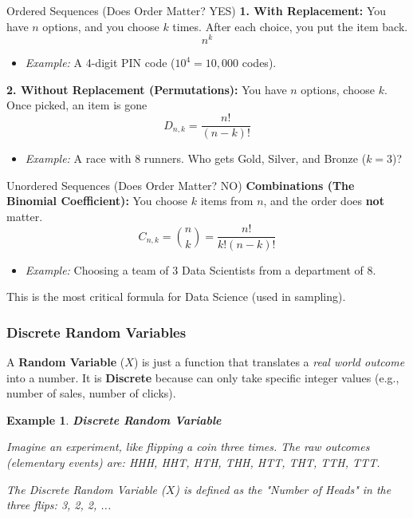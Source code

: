 \documentclass[11pt]{article}
\theoremstyle{smallexample}
\newtheorem{example}{Example}[section]
\newcommand{\vs}{\vspace{0.2\baselineskip}}
\begin{document}
\begin{defbox}{Ordered Sequences (Does Order Matter? YES)}
\textbf{1. With Replacement:}
You have $n$ options, and you choose $k$ times. After each choice, you put the item back.
\begin{equation}
n^k
\end{equation}
\begin{itemize}
    \item \textit{Example:} A 4-digit PIN code ($10^4 = 10,000$ codes).
\end{itemize}

\vs
\textbf{2. Without Replacement (Permutations):}
You have $n$ options, choose $k$. Once picked, an item is gone
\begin{equation}
D_{n,k} = \frac{n!}{(n-k)!}
\end{equation}
\begin{itemize}
    \item \textit{Example:} A race with 8 runners. Who gets Gold, Silver, and Bronze ($k=3$)?

\end{itemize}
\end{defbox}

\begin{defbox}{Unordered Sequences (Does Order Matter? NO)}
\textbf{Combinations (The Binomial Coefficient):}
You choose $k$ items from $n$, and the order does \textbf{not} matter.
    \begin{equation}
        C_{n,k} = \binom{n}{k} = \frac{n!}{k!(n-k)!}
    \end{equation}
\begin{itemize}
    \item \textit{Example:} Choosing a team of 3 Data Scientists from a department of 8.
\end{itemize}
\end{defbox}

This is the most critical formula for Data Science (used in sampling).

\subsubsection{Discrete Random Variables}

A \textbf{Random Variable} ($X$) is just a function that translates a \textit{real world outcome} into a number. It is \textbf{Discrete} because can only take specific integer values (e.g., number of sales, number of clicks).


\pagebreak
\begin{example}{\textbf{Discrete Random Variable}}

  Imagine an experiment, like flipping a coin three times. The raw outcomes (elementary events) are: {HHH, HHT, HTH, THH, HTT, THT, TTH, TTT}.
  
  \vs
  The Discrete Random Variable ($X$) is defined as the "Number of Heads" in the three flips: 3, 2, 2, ...  
\end{example}
\end{document}

